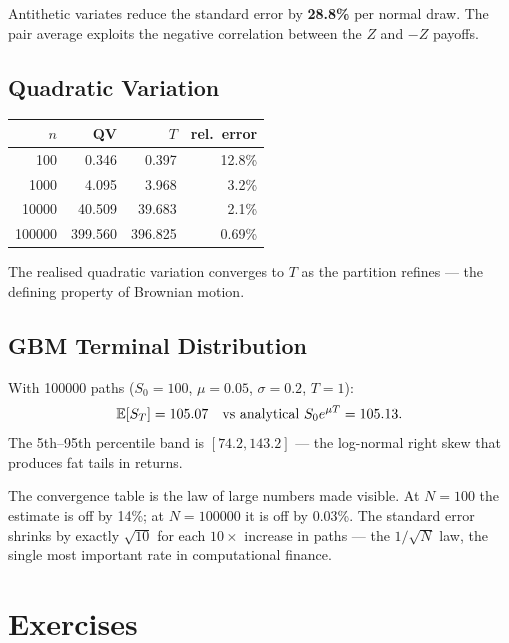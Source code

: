 Antithetic variates reduce the standard error by \textbf{28.8\%} per normal
draw. The pair average exploits the negative correlation between the $Z$ and
$-Z$ payoffs.

\subsection{Quadratic Variation}

\begin{center}
\begin{tabular}{rrrr}
\toprule
$n$ & QV & $T$ & rel.\ error \\
\midrule
100 & 0.346 & 0.397 & 12.8\% \\
1000 & 4.095 & 3.968 & 3.2\% \\
10000 & 40.509 & 39.683 & 2.1\% \\
100000 & 399.560 & 396.825 & 0.69\% \\
\bottomrule
\end{tabular}
\end{center}

The realised quadratic variation converges to $T$ as the partition refines
--- the defining property of Brownian motion.

\subsection{GBM Terminal Distribution}

With 100000 paths ($S_0 = 100$, $\mu = 0.05$, $\sigma = 0.2$, $T = 1$):
\[
\mathbb{E}[S_T] = 105.07 \quad \text{vs analytical } S_0 e^{\mu T} = 105.13.
\]
The 5th--95th percentile band is $[74.2, 143.2]$ --- the log-normal right
skew that produces fat tails in returns.

\begin{keyinsight}
The convergence table is the law of large numbers made visible. At
$N = 100$ the estimate is off by 14\%; at $N = 100000$ it is off by
0.03\%. The standard error shrinks by exactly $\sqrt{10}$ for each
$10\times$ increase in paths --- the $1/\sqrt{N}$ law, the single most
important rate in computational finance.
\end{keyinsight}

\section{Exercises}


